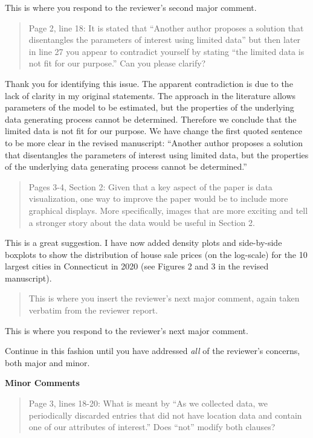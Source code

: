 \documentclass[12pt]{article}
\newenvironment{comment}%
{\begin{quotation}\small\it\noindent\ignorespaces%
}{\end{quotation}}
\begin{document}
This is where you respond to the reviewer's second major comment. 


\begin{comment}
Page 2, line 18: It is stated that ``Another author proposes a solution
that disentangles the parameters of interest using limited data'' but then later
in line 27 you appear to contradict yourself by stating ``the limited data is not 
fit for our purpose.''  Can you please clarify?
\end{comment}

Thank you for identifying this issue. The apparent contradiction is due to the 
lack of clarity in my original statements.  The approach in the literature 
allows parameters of the model to be estimated, but the properties of the 
underlying data generating process cannot be determined.  Therefore we conclude
that the limited data is not fit for our purpose.  We have change the first
quoted sentence to be more clear in the revised manuscript: 
``Another author proposes a solution that disentangles the parameters of 
interest using limited data, but the properties of the underlying data 
generating process cannot be determined.''


\begin{comment}
Pages 3-4, Section 2: Given that a key aspect of the paper is data 
visualization, one way to improve the paper would be to include more graphical
displays.  More specifically, images that are more exciting and tell a stronger
story about the data would be useful in Section 2. 
\end{comment}

This is a great suggestion. I have now added density plots and side-by-side 
boxplots to show the distribution of house sale prices (on the log-scale) 
for the 10 largest cities in Connecticut in 2020 (see Figures 2 and 3 in the 
revised manuscript).

\begin{comment}
	This is where you insert the reviewer's next major comment, again  
	taken verbatim from the reviewer report.  
\end{comment}

This is where you respond to the reviewer's next major comment. 

\bigskip

Continue in this fashion until you have addressed \textit{all} of the reviewer's 
concerns, both major and minor.

\textbf{Minor Comments}

\begin{comment}
\item Page 3, lines 18-20: What is meant by ``As we collected data, we 
periodically discarded entries that did not have location data and contain
one of our attributes of interest.''  Does ``not''  modify both clauses?
\end{comment}
\end{document}
